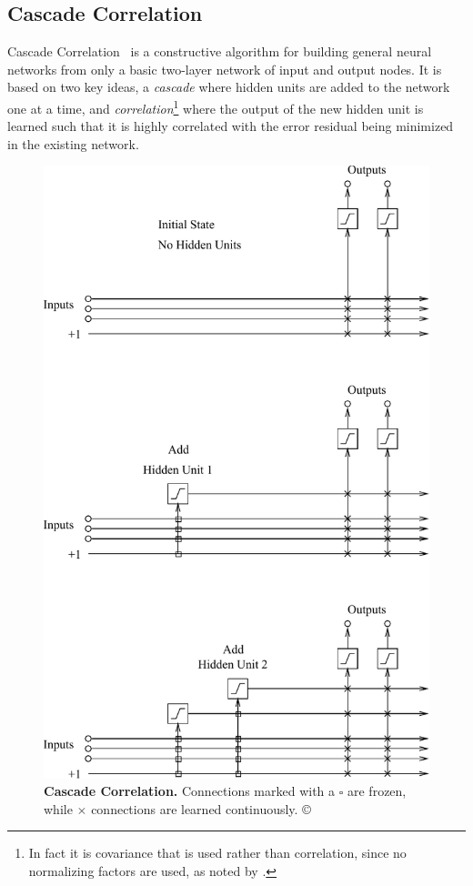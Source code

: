 \documentclass[thesis]{subfiles}
\begin{document}
	\subsection{Cascade Correlation}
	Cascade Correlation~\citep{Fahlman1989} is a constructive algorithm for building general neural networks from only a basic two-layer network of input and output nodes. It is based on two key ideas, a \emph{cascade} where hidden units are added to the network one at a time, and \emph{correlation}\footnote{In fact it is covariance that is used rather than correlation, since no normalizing factors are used, as noted by \citet{Fahlman1989}.} where the output of the new hidden unit is learned such that it is highly correlated with the error residual being minimized in the existing network.
	
	\begin{figure}[tbp]
		\centering
		\includegraphics{Figs/PDF/fahlmancascade}
		\caption[Cascade correlation.]{\textbf{Cascade Correlation.} Connections marked with a $\square$ are frozen, while $\times$ connections are learned continuously. \copyright \citet{Fahlman1989}}
		\label{fig:cascadecorrelation}
	\end{figure}
	
\end{document}
